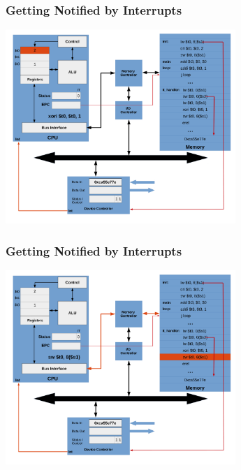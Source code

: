 \documentclass{beamer}
\begin{document}
\begin{frame}[fragile]
\frametitle{Getting Notified by Interrupts}

\begin{center}
\vspace*{-0.23cm}
\hspace*{-1cm}\includegraphics[width=8.7cm]{interrupt_waiting22.pdf}
\end{center}

\end{frame}

\begin{frame}[fragile]
\frametitle{Getting Notified by Interrupts}

\begin{center}
\vspace*{-0.23cm}
\hspace*{-1cm}\includegraphics[width=8.7cm]{interrupt_waiting23.pdf}
\end{center}

\end{frame}
\end{document}
